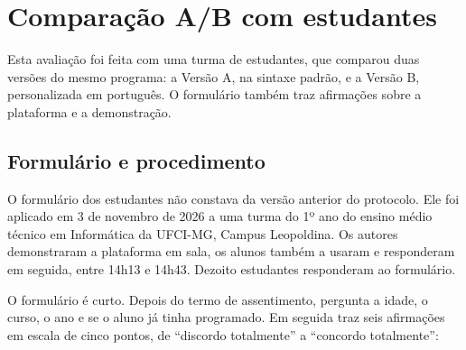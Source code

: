 \section{Comparação A/B com estudantes}
\label{sec:avaliacao-estudantes}

Esta avaliação foi feita com uma turma de estudantes, que comparou duas versões do mesmo programa: a Versão A, na sintaxe padrão, e a Versão B, personalizada em português. O formulário também traz afirmações sobre a plataforma e a demonstração.

\subsection{Formulário e procedimento}
\label{subsec:formulario-estudantes}

O formulário dos estudantes não constava da versão anterior do protocolo. Ele foi aplicado em 3 de novembro de 2026 a uma turma do 1º ano do ensino médio técnico em Informática da UFCI-MG, Campus Leopoldina. Os autores demonstraram a plataforma em sala, os alunos também a usaram e responderam em seguida, entre 14h13 e 14h43. Dezoito estudantes responderam ao formulário.

O formulário é curto. Depois do termo de assentimento, pergunta a idade, o curso, o ano e se o aluno já tinha programado. Em seguida traz seis afirmações em escala de cinco pontos, de ``discordo totalmente'' a ``concordo totalmente'':

